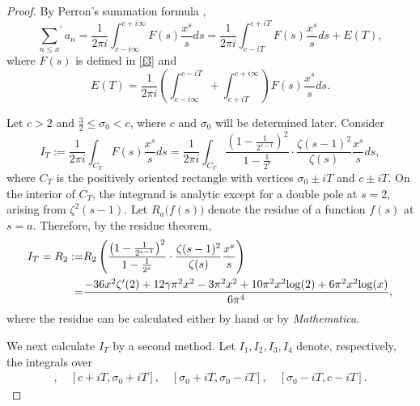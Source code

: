 \documentclass[11pt,reqno]{amsart}
\theoremstyle{plain}
\numberwithin{equation}{section}
\begin{document}
\begin{proof} By Perron's summation formula \cite[pp.~12--14]{hardy-riesz},
\begin{equation}\label{perron1}
{\sum_{n\leq x}}^{\prime}a_n = \frac{1}{2\pi i}\int_{c-i\infty}^{c+i\infty}F(s)\frac{x^s}{s} ds = \frac{1}{2\pi i}\int_{c-iT}^{c+iT}F(s)\frac{x^s}{s} ds + E(T),
\end{equation}
where $F(s)$ is defined in \eqref{f3} and
\begin{equation}\label{E}
E(T)=\frac{1}{2\pi i}\left(\int_{c-i\infty}^{c-iT}+\int_{c+iT}^{c+i\infty}\right)F(s)\frac{x^s}{s} ds.
\end{equation}

 Let $c>2$ and $\frac32\leq \sigma_0 <c$, where $c$ and $\sigma_0$ will be determined later.  Consider
\begin{equation*}
    I_T:= \frac{1}{2\pi i}\int_{C_T}F(s)\frac{x^s}{s} ds=
    \frac{1}{2\pi i}\int_{C_T}\frac{\left(1-\frac{1}{2^{s-1}}\right)^2}{1-\frac{1}{2^s}}\cdot \frac{\zeta(s-1)^2}{\zeta(s)}\frac{x^s}{s} ds,\label{integral}
\end{equation*}
where $C_T$ is the positively oriented rectangle with vertices $\sigma_0 \pm iT$ and $c\pm iT$.
On the interior of $C_T$, the integrand is analytic except for a double pole at $s=2$, arising from $\zeta^2(s-1)$.  Let $R_a\bigl(f(s)\bigr)$  denote the residue of a function $f(s)$ at $s=a$.   Therefore, by the residue theorem,
\begin{align}\label{residuetheorem}
I_T=R_2:=&R_2\left(\frac{\left(1-\frac{1}{2^{s-1}}\right)^2}{1-\frac{1}{2^s}}\cdot \frac{\zeta(s-1)^2}{\zeta(s)}\frac{x^s}{s}\right)\notag\\
    =& \frac{-36x^2\zeta'(2)+12\gamma \pi^2x^2-3\pi^2x^2+10\pi^2x^2\mathrm{log}(2)+6\pi^2x^2\mathrm{log}(x)}{6\pi^4},
\end{align}
where the residue can be calculated either by hand or by \emph{Mathematica}.

We next calculate $I_T$ by a second method.  Let $I_1,I_2,I_3,I_4$ denote, respectively, the integrals over
\begin{align*}
    [c-iT,c+iT],\quad [c+iT,\sigma_0 +iT],\quad
[\sigma_0+iT,\sigma_0-iT],\quad
[\sigma_0-iT,c-iT].
\end{align*}



\end{proof}
\end{document}
